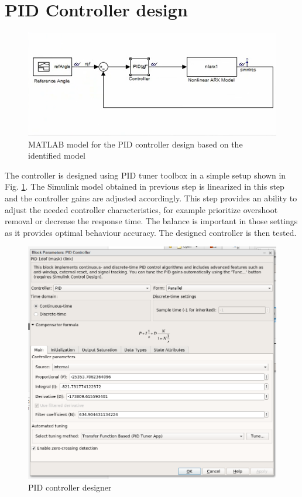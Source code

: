 \documentclass[]{final_report}
\begin{document}
\section{PID Controller design}

\begin{figure} [h!]
\centerline{\includegraphics[width=.85\textwidth]{Screenshots for paper/matlab models/PIDdesign.png}}
\caption{MATLAB model for the PID controller design based on the identified model}
\label{fig:PIDdes}
\end{figure}

The controller is designed using PID tuner toolbox in a simple setup shown in Fig. \ref{fig:PIDdes}. The Simulink model obtained in previous step is linearized in this step and the controller gains are adjusted accordingly. This step provides an ability to adjust the needed controller characteristics, for example prioritize overshoot removal or decrease the response time. The balance is important in those settings as it provides optimal behaviour accuracy. The designed controller is then tested.


\begin{figure} [h!]
\centerline{\includegraphics[width=.85\textwidth]{Screenshots for paper/arduino/Final_hardware_testing/pid_tuner.PNG}}
\caption{PID controller designer}
\label{fig:PIDtunerMATLAB}
\end{figure}
\end{document}
